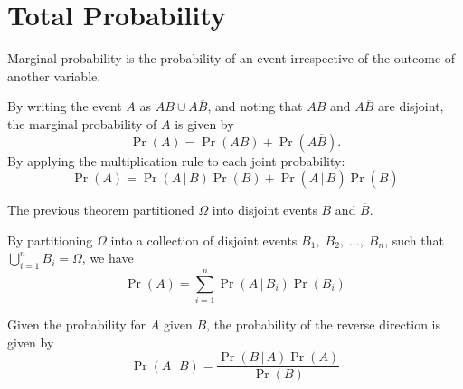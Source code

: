\documentclass{article}
\begin{document}
\section{Total Probability}
\begin{definition}
    Marginal probability is the probability of an event \linebreak irrespective of the outcome of another variable.
\end{definition}
\begin{theorem}
    By writing the event \(A\) as \(AB \cup A\overline{B}\), and noting that \(AB\) and \(A\overline{B}\) are disjoint,
    the marginal probability of \(A\) is given by
    \begin{equation*}
        \Pr{\left( A \right)} = \Pr{\left( AB \right)} + \Pr{\left( A\overline{B} \right)}.
    \end{equation*}
    By applying the multiplication rule to each joint probability:
    \begin{equation*}
        \Pr{\left( A \right)} = \Pr{\left( A \,\vert\, B \right)}\Pr{\left( B \right)} + \Pr{\left( A \,\vert\, \overline{B} \right)}\Pr{\left( \overline{B} \right)}
    \end{equation*}
\end{theorem}
\begin{theorem}
    The previous theorem partitioned \(\Omega\) into disjoint events \(B\) and \(\overline{B}\).

    By partitioning \(\Omega\) into a collection of disjoint events \(B_1,\; B_2,\; \dots,\; B_n\),
    such that \(\bigcup_{i=1}^n B_i = \Omega\), we have
    \begin{equation*}
        \Pr{\left( A \right)} = \sum_{i = 1}^n \Pr{\left( A \,\vert\, B_i \right)}\Pr{\left( B_i \right)}
    \end{equation*}
\end{theorem}
\begin{theorem}
    Given the probability for \(A\) given \(B\), the probability of the reverse direction is given by
    \begin{equation*}
        \Pr{\left( A \,\vert\, B \right)} = \frac{\Pr{\left( B \,\vert\, A \right)}\Pr{\left( A \right)}}{\Pr{\left( B \right)}}
    \end{equation*}
\end{theorem}
\end{document}
